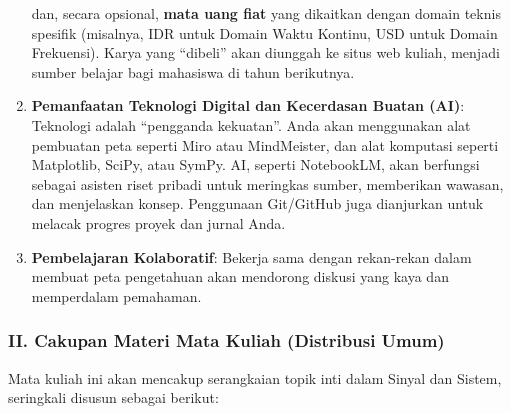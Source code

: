 \documentclass[
  letterpaper,
  DIV=11,
  numbers=noendperiod]{scrreprt}
\begin{document}
\begin{enumerate}
  dan, secara opsional, \textbf{mata uang fiat} yang dikaitkan dengan
  domain teknis spesifik (misalnya, IDR untuk Domain Waktu Kontinu, USD
  untuk Domain Frekuensi). Karya yang ``dibeli'' akan diunggah ke situs
  web kuliah, menjadi sumber belajar bagi mahasiswa di tahun berikutnya.
\item
  \textbf{Pemanfaatan Teknologi Digital dan Kecerdasan Buatan (AI)}:
  Teknologi adalah ``pengganda kekuatan''. Anda akan menggunakan alat
  pembuatan peta seperti Miro atau MindMeister, dan alat komputasi
  seperti Matplotlib, SciPy, atau SymPy. AI, seperti NotebookLM, akan
  berfungsi sebagai asisten riset pribadi untuk meringkas sumber,
  memberikan wawasan, dan menjelaskan konsep. Penggunaan Git/GitHub juga
  dianjurkan untuk melacak progres proyek dan jurnal Anda.
\item
  \textbf{Pembelajaran Kolaboratif}: Bekerja sama dengan rekan-rekan
  dalam membuat peta pengetahuan akan mendorong diskusi yang kaya dan
  memperdalam pemahaman.
\end{enumerate}

\subsubsection{\texorpdfstring{\textbf{II. Cakupan Materi Mata Kuliah
(Distribusi
Umum)}}{II. Cakupan Materi Mata Kuliah (Distribusi Umum)}}\label{ii.-cakupan-materi-mata-kuliah-distribusi-umum}

Mata kuliah ini akan mencakup serangkaian topik inti dalam Sinyal dan
Sistem, seringkali disusun sebagai berikut:
\end{document}
